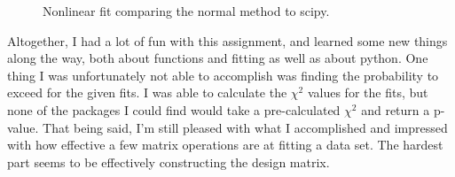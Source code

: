 \documentclass[twocolumn,11pt]{article}
\begin{document}
\begin{figure}[!h]
	\centering
	\noindent
      \caption{Nonlinear fit comparing the normal method to scipy.}
\end{figure}


Altogether, I had a lot of fun with this assignment, and learned some new things along the way, both about functions and fitting as well as about python. One thing I was unfortunately not able to accomplish was finding the probability to exceed for the given fits. I was able to calculate the $\chi^2$ values for the fits, but none of the packages I could find would take a pre-calculated $\chi^2$ and return a p-value. That being said, I'm still pleased with what I accomplished and impressed with how effective a few matrix operations are at fitting a data set. The hardest part seems to be effectively constructing the design matrix.
\end{document}
